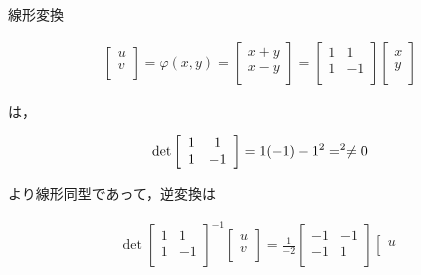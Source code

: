 \documentclass[a4paper,10pt]{jarticle}
\begin{document}
\begin{enumerate}
線形変換
\begin{fleqn}[30pt] \begin{gather*}
 	\left[ \begin{array}{r}
		u \\
		v \\
	\end{array}  \right]
	= \varphi(x,y)=
 	\left[ \begin{array}{r}
		x+y \\
		x-y \\
	\end{array}  \right]
	=
 	\left[ \begin{array}{cc}
		1 & 1 \\
		1 & -1 \\
	\end{array}  \right]
 	\left[ \begin{array}{r}
		x \\
		y \\
	\end{array}  \right]
\end{gather*} \end{fleqn}
は，
\begin{fleqn}[30pt] \begin{gather*}
	\rm{det}
 	\left[ \begin{array}{cc}
		1 & 1 \\
		1 & -1 \\
	\end{array}  \right]
	=1(-1)-1^2=^2 \ne 0
\end{gather*} \end{fleqn}
より線形同型であって，逆変換は
\begin{fleqn}[30pt] \begin{gather*}
	\det
 	\left[ \begin{array}{cc}
		1 & 1 \\
		1 & -1 \\
	\end{array}  \right]^{-1}
 	\left[ \begin{array}{r}
		u \\
		v \\
	\end{array}  \right]
	=\frac{1}{-2}
 	\left[ \begin{array}{cc}
		-1 & -1 \\
		-1 & 1 \\
	\end{array}  \right]
 	\left[ \begin{array}{r}
		u \\

\end{array}
\end{gather*}
\end{fleqn}
\end{enumerate}
\end{document}
